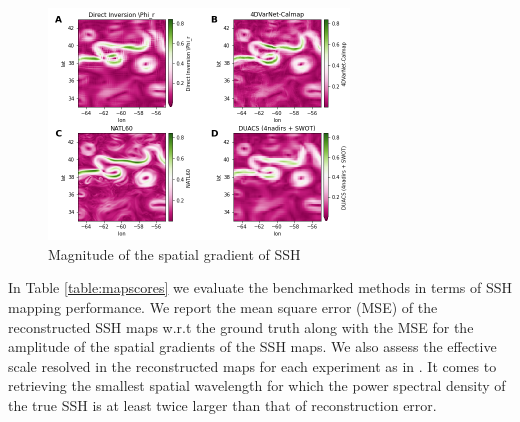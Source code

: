 \documentclass{article}
\begin{document}
\begin{figure}[htb]
\begin{minipage}[b]{1.\linewidth}
  \centering
  \centerline{\includegraphics[width=8.0cm]{figs/new_grid_grad_w_phi}}
	\caption{Magnitude of the spatial gradient of SSH  }\smallskip
\end{minipage}
\end{figure}
%

In Table \ref{table:mapscores} we evaluate the benchmarked methods in terms of SSH mapping performance. We report the mean square error (MSE) of the reconstructed SSH maps w.r.t the ground truth along with the MSE for the amplitude of the spatial gradients of the SSH maps. We also assess the effective scale resolved in the reconstructed maps for each experiment as in \cite{bfn}. It comes to retrieving the smallest spatial wavelength for which the power spectral density of the true SSH is at least twice larger than that of reconstruction error. %


\end{document}
